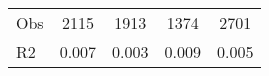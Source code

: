 \begin{tabular}{l*{4}{c}}
\hline                                                                                                                                                                                                                                            
 Obs                   &               2115               &       1913                       &       1374                &              2701                                               \\ 
 R2                    &                      0.007              &              0.003                      &              0.009               &                     0.005                                              \\ 
\hline \end{tabular}                                                                                                                                                                                                              